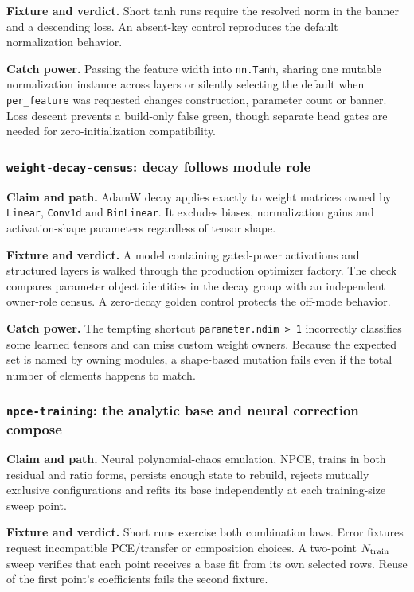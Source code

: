 \documentclass[10pt,aps,prd,twocolumn,nofootinbib]{revtex4-2}
\newcommand{\code}[1]{\texttt{#1}}
\begin{document}
\textbf{Fixture and verdict.}  Short tanh runs require the resolved norm in
the banner and a descending loss.  An absent-key control reproduces the
default normalization behavior.

\textbf{Catch power.}  Passing the feature width into \code{nn.Tanh}, sharing
one mutable normalization instance across layers or silently selecting the
default when \code{per\_feature} was requested changes construction, parameter
count or banner.  Loss descent prevents a build-only false green, though separate
head gates are needed for zero-initialization compatibility.

\subsubsection{\code{weight-decay-census}: decay follows module role}

\textbf{Claim and path.}  AdamW decay applies exactly to weight matrices owned
by \code{Linear}, \code{Conv1d} and \code{BinLinear}.  It excludes biases,
normalization gains and activation-shape parameters regardless of tensor
shape.

\textbf{Fixture and verdict.}  A model containing gated-power activations and
structured layers is walked through the production optimizer factory.  The
check compares parameter object identities in the decay group with an
independent owner-role census.  A zero-decay golden control protects the
off-mode behavior.

\textbf{Catch power.}  The tempting shortcut \code{parameter.ndim > 1}
incorrectly classifies some learned tensors and can miss custom weight
owners.  Because the expected set is named by owning modules, a shape-based
mutation fails even if the total number of elements happens to match.

\subsubsection{\code{npce-training}: the analytic base and neural correction compose}

\textbf{Claim and path.}  Neural polynomial-chaos emulation, NPCE, trains in
both residual and ratio forms, persists enough state to rebuild, rejects
mutually exclusive configurations and refits its base independently at each
training-size sweep point.

\textbf{Fixture and verdict.}  Short runs exercise both combination laws.
Error fixtures request incompatible PCE/transfer or composition choices.  A
two-point \(N_{\rm train}\) sweep verifies that each point receives a base fit
from its own selected rows.  Reuse of the first point's coefficients fails the
second fixture.
\end{document}
